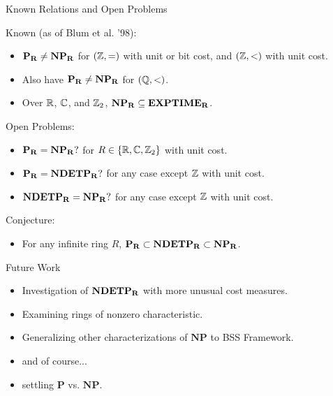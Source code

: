 \documentclass[c]{beamer}
\begin{document}
\begin{frame}{Known Relations and Open Problems}

  Known (as of Blum et al. '98): 
  \begin{itemize}
  \item $\mathbf{P_R} \neq \mathbf{NP_R}$ for $(\mathbb{Z}, =)$ with unit or bit cost, and
    $(\mathbb{Z}, <)$ with unit cost.
  \item Also have $\mathbf{P_R} \neq \mathbf{NP_R}$ for $(\mathbb{Q}, <)$.
  \item Over $\mathbb{R}$, $\mathbb{C}$, and $\mathbb{Z}_2$, $\mathbf{NP_R} \subseteq
    \mathbf{EXPTIME_R}$.\pause
  \end{itemize}
  
  \vspace{\baselineskip}

  Open Problems:
  \begin{itemize}
  \item $\mathbf{P_R} = \mathbf{NP_R}?$ for $R \in \{\mathbb{R}, \mathbb{C}, \mathbb{Z}_2\}$
    with unit cost.
  \item $\mathbf{P_R} = \mathbf{NDETP_R}?$ for any case except $\mathbb{Z}$ with unit cost.
  \item $\mathbf{NDETP_R} = \mathbf{NP_R}?$ for any case except $\mathbb{Z}$ with unit cost.
  \end{itemize}\pause

  \vspace{\baselineskip}

  Conjecture:
  \begin{itemize}
    \item For any infinite ring $R$, $\mathbf{P_R} \subset \mathbf{NDETP_R} \subset \mathbf{NP_R}$.
  \end{itemize}
  
\end{frame}

\begin{frame}{Future Work}
  
  \begin{itemize}
  \item Investigation of $\mathbf{NDETP_R}$ with more unusual cost measures. \pause
  \item Examining rings of nonzero characteristic. \pause
  \item Generalizing other characterizations of $\mathbf{NP}$ to BSS
    Framework. \pause
  \item[] and of course... 
  \item settling $\mathbf{P}$ vs. $\mathbf{NP}$.

  \end{itemize}
\end{frame}
\end{document}
